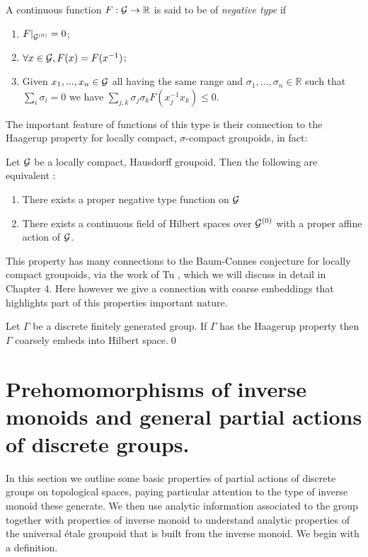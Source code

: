 \begin{definition}
A continuous function $F: \mathcal{G} \rightarrow \mathbb{R}$ is said to be of \textit{negative type} if 
\begin{enumerate}
\item $F|_{\mathcal{G}^{(0)}}=0$;
\item $\forall x \in \mathcal{G}, F(x)=F(x^{-1})$;
\item Given $x_{1},...,x_{n} \in \mathcal{G}$ all having the same range and $\sigma_{1},...,\sigma_{n} \in \mathbb{R}$ such that $\sum_{i}\sigma_{i}=0$ we have $\sum_{j,k}\sigma_{j}\sigma_{k}F(x_{j}^{-1}x_{k})\leq 0$.
\end{enumerate}
\end{definition}

The important feature of functions of this type is their connection to the Haagerup property for locally compact, $\sigma$-compact groupoids, in fact:
\begin{theorem}Let $\mathcal{G}$ be a locally compact, Hausdorff groupoid. Then the following are equivalent \cite{MR1703305}:
\begin{enumerate}
\item There exists a proper negative type function on $\mathcal{G}$
\item There exists a continuous field of Hilbert spaces over $\mathcal{G}^{(0)}$ with a proper affine action of $\mathcal{G}$.
\end{enumerate}
\end{theorem}

This property has many connections to the Baum-Connes conjecture for locally compact groupoids, via the work of Tu \cite{}, which we will discuss in detail in Chapter 4. Here however we give a connection with coarse embeddings that highlights part of this properties important nature.

\begin{proposition}
Let $\Gamma$ be a discrete finitely generated group. If $\Gamma$ has the Haagerup property then $\Gamma$ coarsely embeds into Hilbert space.\qed
\end{proposition}

\section{Prehomomorphisms of inverse monoids and general partial actions of discrete groups.}\label{Sect:S3} 
In this section we outline some basic properties of partial actions of discrete groups on topological spaces, paying particular attention to the type of inverse monoid these generate. We then use analytic information associated to the group together with properties of inverse monoid to understand analytic properties of the universal \'etale groupoid that is built from the inverse monoid. We begin with a definition.

